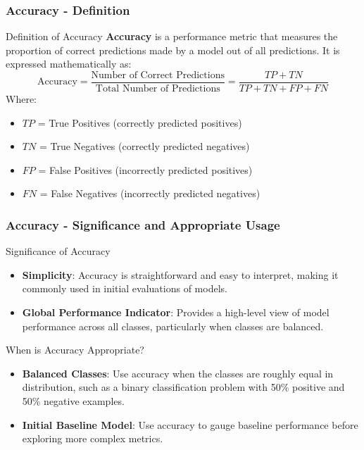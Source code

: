 \documentclass[aspectratio=169]{beamer}
\begin{document}
\begin{frame}[fragile]
    \frametitle{Accuracy - Definition}
    \begin{block}{Definition of Accuracy}
        \textbf{Accuracy} is a performance metric that measures the proportion of correct predictions made by a model out of all predictions. It is expressed mathematically as:
        \begin{equation}
        \text{Accuracy} = \frac{\text{Number of Correct Predictions}}{\text{Total Number of Predictions}} = \frac{TP + TN}{TP + TN + FP + FN}
        \end{equation}
        Where:
        \begin{itemize}
            \item \(TP\) = True Positives (correctly predicted positives)
            \item \(TN\) = True Negatives (correctly predicted negatives)
            \item \(FP\) = False Positives (incorrectly predicted positives)
            \item \(FN\) = False Negatives (incorrectly predicted negatives)
        \end{itemize}
    \end{block}
\end{frame}

\begin{frame}[fragile]
    \frametitle{Accuracy - Significance and Appropriate Usage}
    \begin{block}{Significance of Accuracy}
        \begin{itemize}
            \item \textbf{Simplicity}: Accuracy is straightforward and easy to interpret, making it commonly used in initial evaluations of models.
            \item \textbf{Global Performance Indicator}: Provides a high-level view of model performance across all classes, particularly when classes are balanced.
        \end{itemize}
    \end{block}
    
    \begin{block}{When is Accuracy Appropriate?}
        \begin{itemize}
            \item \textbf{Balanced Classes}: Use accuracy when the classes are roughly equal in distribution, such as a binary classification problem with 50\% positive and 50\% negative examples.
            \item \textbf{Initial Baseline Model}: Use accuracy to gauge baseline performance before exploring more complex metrics.
        \end{itemize}
    \end{block}
\end{frame}
\end{document}
